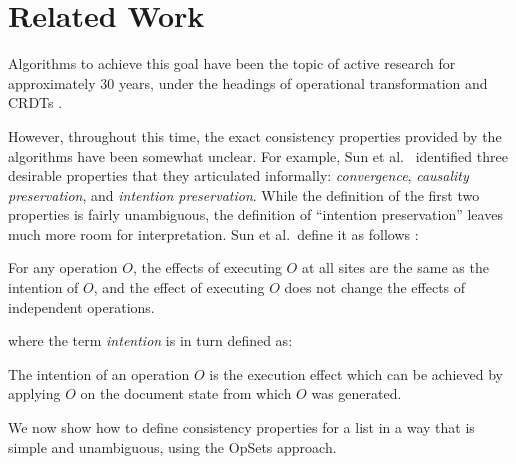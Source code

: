 \section{Related Work}\label{sec:relwork}


Algorithms to achieve this goal have been the topic of active research for approximately 30 years, under the headings of operational transformation \cite{Ellis:1989ue,Li:2004er,Nichols:1995fd,Oster:2006tr,Ressel:1996wx,Suleiman:1998eu,Sun:1998vf,Sun:1998un} and CRDTs \cite{Nedelec:2013ky,Nedelec:2016eo,Oster:2006wj,Preguica:2009fz,Roh:2011dw,Weiss:2010hx}.

However, throughout this time, the exact consistency properties provided by the algorithms have been somewhat unclear.
For example, Sun et al.~\cite{Sun:1998un} identified three desirable properties that they articulated informally: \emph{convergence}, \emph{causality preservation}, and \emph{intention preservation}.
While the definition of the first two properties is fairly unambiguous, the definition of ``intention preservation'' leaves much more room for interpretation.
Sun et al.\ define it as follows \cite{Sun:1998un}:
\begin{displayquote}
For any operation $O$, the effects of executing $O$ at all sites are the same as the intention of $O$, and the effect of executing $O$ does not change the effects of independent operations.
\end{displayquote}
where the term \emph{intention} is in turn defined as:
\begin{displayquote}
The intention of an operation $O$ is the execution effect which can be achieved by applying $O$ on the document state from which $O$ was generated.
\end{displayquote}
We now show how to define consistency properties for a list in a way that is simple and unambiguous, using the OpSets approach.

